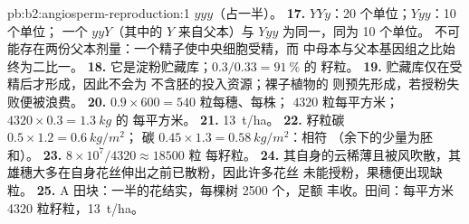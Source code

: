 \begin{solution}{pb:b2:angiosperm-reproduction:1}
$yyy$（占一半）。
\textbf{17.} $YYy$：20 个单位；$Yyy$：10 个单位；
一个 $yyY$（其中的 $Y$ 来自父本）与 $Yyy$ 为同一，同为 10 个单位。
不可能存在两份父本剂量：一个精子使中央细胞受精，而
中母本与父本基因组之比始终为二比一。
\textbf{18.} 它是淀粉贮藏库；$0.3/0.33 = \qty{91}{\%}$ 的
籽粒。
\textbf{19.} 贮藏库仅在受精后才形成，因此不会为
不含胚的投入资源；裸子植物的
则预先形成，若授粉失败便被浪费。
\textbf{20.} $0.9\times 600 = 540$ 粒每穗、每株；
$4320$ 粒每平方米；$4320\times 0.3 = \qty{1.3}{kg}$ 的
每平方米。
\textbf{21.} \qty{13}{t/ha}。
\textbf{22.} 籽粒碳 $0.5\times 1.2 = \qty{0.6}{kg/m^2}$；
碳 $0.45\times 1.3 = \qty{0.58}{kg/m^2}$：相符
（余下的少量为胚和）。
\textbf{23.} $8\times 10^{7}/4320 \approx \num{18500}$ 粒
每籽粒。
\textbf{24.} 其自身的云稀薄且被风吹散，其
雄穗大多在自身花丝伸出之前已散粉，因此许多花丝
未能授粉，果穗便出现缺粒。
\textbf{25.} A 田块：一半的花结实，每棵树 2500 个，足额
丰收。田间：每平方米 4320 粒籽粒，\qty{13}{t/ha}。
\end{solution}
